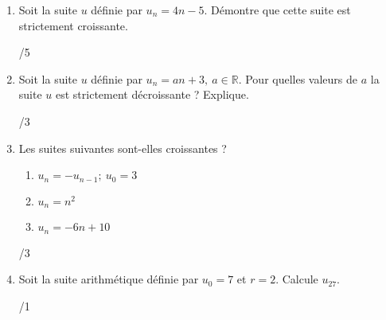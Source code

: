 \begin{enumerate}
			\item 
				\begin{minipage}[t]{.9\textwidth}
					Soit la suite $u$ définie par $u_n = 4n-5$. Démontre que cette suite est strictement croissante.
				\end{minipage}%
				\begin{minipage}{.1\textwidth}
					\begin{flushright}
						{\large /5}
					\end{flushright}
				\end{minipage}
				\vspace{1em}
				
			\item 
				\begin{minipage}[t]{.9\textwidth}
					Soit la suite $u$ définie par $u_n = an + 3, ~a \in \mathbb{R}$. Pour quelles valeurs de $a$ la suite $u$ est strictement décroissante ? Explique.
				\end{minipage}%
				\begin{minipage}{.1\textwidth}
					\begin{flushright}
						{\large /3}
					\end{flushright}
				\end{minipage}
				\vspace{1em}
				
			\item 
				\begin{minipage}[t]{.9\textwidth}
					Les suites suivantes sont-elles croissantes ?
					\begin{enumerate}
						\item $u_n = - u_{n-1}; ~u_0 = 3$
						\item $u_n = n^2$
						\item $u_n = -6n + 10$
					\end{enumerate}
				\end{minipage}%
				\begin{minipage}{.1\textwidth}
					\begin{flushright}
						{\large /3}
					\end{flushright}
				\end{minipage}
				\vspace{1em}
				
			\item
				\begin{minipage}[t]{.9\textwidth}
					Soit la suite arithmétique définie par $u_0 = 7$ et $r=2$. Calcule $u_{27}$.
				\end{minipage}%
				\begin{minipage}{.1\textwidth}
					\begin{flushright}
						{\large /1}
					\end{flushright}
				\end{minipage}
				\vspace{1em}
				

\end{enumerate}
